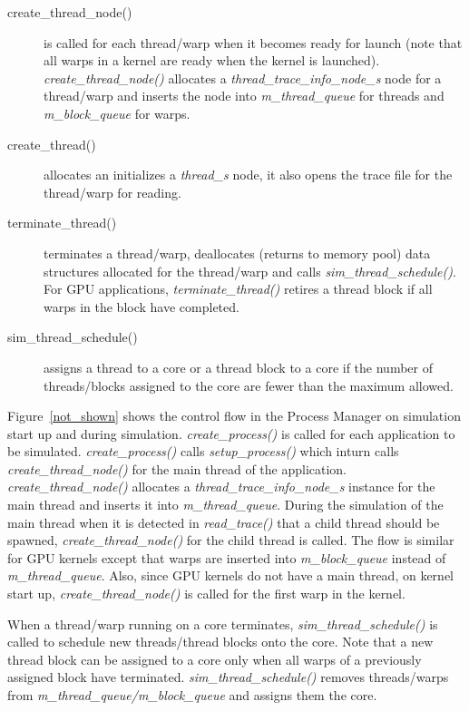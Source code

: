 \begin{description}
\begin{description}
\item [create\_thread\_node()] is called for each thread/warp when it becomes
ready for launch (note that all warps in a kernel are ready when the kernel is
    launched). \textit{create\_thread\_node()} allocates a
\textit{thread\_trace\_info\_node\_s} node for a thread/warp and inserts the
node into \textit{m\_thread\_queue} for threads and \textit{m\_block\_queue}
for warps.

\item [create\_thread()] allocates an initializes a \textit{thread\_s} node, it
also opens the trace file for the thread/warp for reading.


\item [terminate\_thread()] terminates a thread/warp, deallocates (returns to
    memory pool) data structures allocated for the thread/warp and calls
\textit{sim\_thread\_schedule()}. For GPU applications,
  \textit{terminate\_thread()} retires a thread block if all warps in the block
  have completed. 


\item [sim\_thread\_schedule()] assigns a thread to a core or a thread block to
a core if the number of threads/blocks assigned to the core are fewer than the
maximum allowed.

\end{description}

\end{description}


Figure~\ref{not_shown} shows the control flow in the Process Manager on
simulation start up and during simulation. \textit{create\_process()} is called
for each application to be simulated. \textit{create\_process()} calls
\textit{setup\_process()} which inturn calls \textit{create\_thread\_node()}
for the main thread of the application. \textit{create\_thread\_node()}
allocates a \textit{thread\_trace\_info\_node\_s} instance for the main thread
and inserts it into \textit{m\_thread\_queue}. During the simulation of the
main thread when it is detected in \textit{read\_trace()} that a child thread
should be spawned, \textit{create\_thread\_node()} for the child thread is
called. The flow is similar for GPU kernels except that warps are inserted into
\textit{m\_block\_queue} instead of \textit{m\_thread\_queue}. Also, since GPU
kernels do not have a main thread, on kernel start up,
\textit{create\_thread\_node()} is called for the first warp in the
kernel. 

When a thread/warp running on a core terminates,
     \textit{sim\_thread\_schedule()} is called to schedule new threads/thread
     blocks onto the core. Note that a new thread block can be assigned to a
     core only when all warps of a previously assigned block have terminated.
     \textit{sim\_thread\_schedule()} removes threads/warps from
     \textit{m\_thread\_queue/m\_block\_queue} and assigns them the core.

